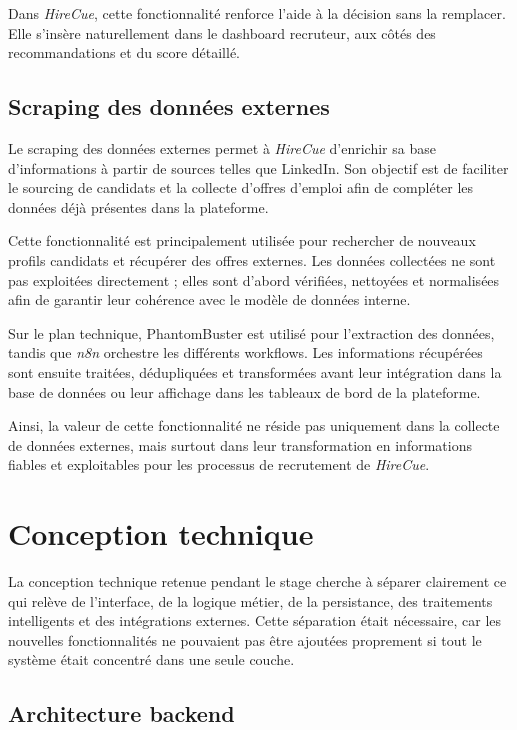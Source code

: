 Dans \textit{HireCue}, cette fonctionnalité renforce l'aide à la décision sans la remplacer. Elle s'insère naturellement dans le dashboard recruteur, aux côtés des recommandations et du score détaillé.

\subsection{Scraping des données externes}

Le scraping des données externes permet à \textit{HireCue} d'enrichir sa base d'informations à partir de sources telles que LinkedIn. Son objectif est de faciliter le sourcing de candidats et la collecte d'offres d'emploi afin de compléter les données déjà présentes dans la plateforme.

Cette fonctionnalité est principalement utilisée pour rechercher de nouveaux profils candidats et récupérer des offres externes. Les données collectées ne sont pas exploitées directement ; elles sont d'abord vérifiées, nettoyées et normalisées afin de garantir leur cohérence avec le modèle de données interne.

Sur le plan technique, PhantomBuster est utilisé pour l'extraction des données, tandis que \textit{n8n} orchestre les différents workflows. Les informations récupérées sont ensuite traitées, dédupliquées et transformées avant leur intégration dans la base de données ou leur affichage dans les tableaux de bord de la plateforme.

Ainsi, la valeur de cette fonctionnalité ne réside pas uniquement dans la collecte de données externes, mais surtout dans leur transformation en informations fiables et exploitables pour les processus de recrutement de \textit{HireCue}.
\section{Conception technique}

La conception technique retenue pendant le stage cherche à séparer clairement ce qui relève de l'interface, de la logique métier, de la persistance, des traitements intelligents et des intégrations externes. Cette séparation était nécessaire, car les nouvelles fonctionnalités ne pouvaient pas être ajoutées proprement si tout le système était concentré dans une seule couche.

\subsection{Architecture backend}

